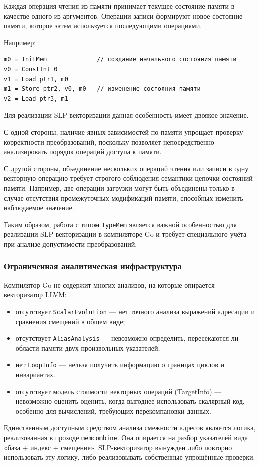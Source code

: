 Каждая операция чтения из памяти принимает текущее состояние памяти в качестве одного из аргументов. 
Операции записи формируют новое состояние памяти, которое затем используется последующими операциями. 

Например:

\begin{verbatim}
m0 = InitMem              // создание начального состояния памяти
v0 = ConstInt 0
v1 = Load ptr1, m0
m1 = Store ptr2, v0, m0   // изменение состояния памяти
v2 = Load ptr3, m1
\end{verbatim}

Для реализации SLP-векторизации данная особенность имеет двоякое значение.

С одной стороны, наличие явных зависимостей по памяти упрощает проверку корректности преобразований, 
поскольку позволяет непосредственно анализировать порядок операций доступа к памяти.

С другой стороны, объединение нескольких операций чтения или записи в одну векторную операцию требует строгого соблюдения семантики цепочки состояний памяти.
Например, две операции загрузки могут быть объединены только в случае отсутствия промежуточных модификаций памяти, способных изменить наблюдаемое значение. 

Таким образом, работа с типом \texttt{TypeMem} является важной особенностью для реализации SLP-векторизации в компиляторе Go 
и требует специального учёта при анализе допустимости преобразований.

\subsubsection{Ограниченная аналитическая инфраструктура}

Компилятор Go не содержит многих анализов, на которые опирается векторизатор LLVM:
\begin{itemize}
    \item отсутствует \texttt{ScalarEvolution} --- нет точного анализа выражений адресации и сравнения смещений в общем виде;
    \item отсутствует \texttt{AliasAnalysis} --- невозможно определить, пересекаются ли области памяти двух произвольных указателей;
    \item нет \texttt{LoopInfo} --- нельзя получить информацию о границах циклов и инвариантах.
    \item отсутствует модель стоимости векторных операций (TargetInfo) --- невозможно оценить оценить, когда выгоднее использовать скалярный код, 
    особенно для вычислений, требующих перекомпановки данных. 
\end{itemize}
Единственным доступным средством анализа смежности адресов является логика, реализованная в проходе \texttt{memcombine}. 
Она опирается на разбор указателей вида «база + индекс + смещение».
SLP-векторизатор вынужден либо повторно использовать эту логику, либо реализовывать собственные упрощённые проверки.

